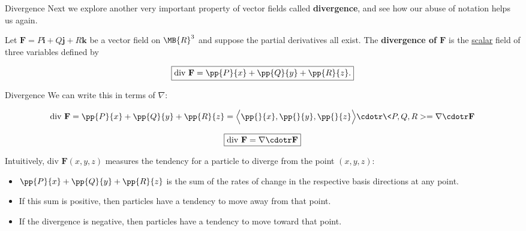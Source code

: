 \documentclass[11pt,english,
handout
]{beamer}
\begin{document}
\begin{frame}{Divergence}
\small
Next we explore another very important property of vector fields called \textbf{divergence}, and see how our abuse of notation helps us again.\pause

\lspace
\begin{definition}
Let $\mathbf{F}=P\mathbf{i}+Q\mathbf{j}+R\mathbf{k}$ be a vector field on $\MB{R}^3$ and suppose the partial derivatives all exist. The \textbf{divergence of $\mathbf{F}$} is the \uline{scalar} field of three variables defined by 

\[
\boxed{\text{div }\mathbf{F}=\pp{P}{x}+\pp{Q}{y}+\pp{R}{z}.}
\]
\end{definition}
\end{frame}
















\begin{frame}[t]{Divergence}
\small
We can write this in terms of $\nabla$:

\[
\text{div }\mathbf{F}=\pp{P}{x}+\pp{Q}{y}+\pp{R}{z}=\Bigl<\pp{}{x},\pp{}{y},\pp{}{z}\Bigr>\cdotr\<P,Q,R>=\nabla\cdotr\mathbf{F}
\]

\[
\boxed{\text{div }\mathbf{F}=\nabla\cdotr\mathbf{F}}
\]\pause


Intuitively, div $\mathbf{F}(x,y,z)$ measures the tendency for a particle to diverge from the point $(x,y,z)$:\pause

\begin{itemize}
\itemsep2mm
\item $\pp{P}{x}+\pp{Q}{y}+\pp{R}{z}$ is the sum of the rates of change in the respective basis directions at any point.\pause
\item If this sum is positive, then particles have a tendency to move away from that point.\pause
\item If the divergence is negative, then particles have a tendency to move toward that point.
\end{itemize}
\end{frame}
\end{document}
